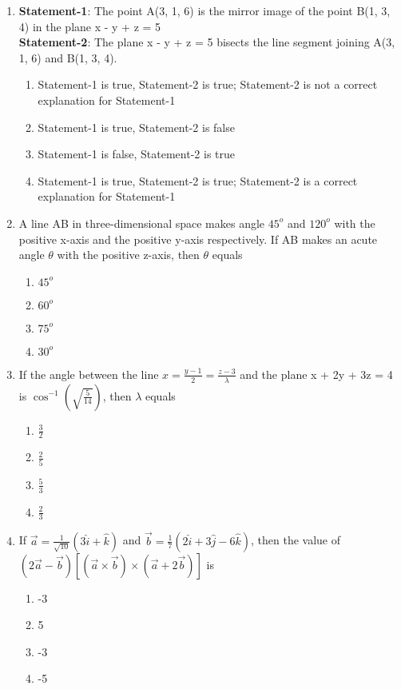 \begin{enumerate}[label=\arabic*.,ref=\thesubsection.\theenumi]
\item \textbf{Statement-1}: The point A(3, 1, 6) is the mirror image of the point B(1, 3, 4) in the plane x - y + z = 5\\
\textbf{Statement-2}: The plane x - y + z = 5 bisects the line segment joining A(3, 1, 6) and B(1, 3, 4).
\begin{enumerate}
\item Statement-1 is true, Statement-2 is true; Statement-2 is not a correct explanation for Statement-1
\item Statement-1 is true, Statement-2 is false
\item Statement-1 is false, Statement-2 is true
\item Statement-1 is true, Statement-2 is true; Statement-2 is a correct explanation for Statement-1
\end{enumerate}

\item A line AB in three-dimensional space makes angle $45^{o}$ and $120^{o}$ with the positive x-axis and the positive y-axis respectively. If AB makes an acute angle $\theta$ with the positive z-axis, then $\theta$ equals
\begin{enumerate}
\item $45^{o}$
\item $60^{o}$
\item $75^{o}$
\item $30^{o}$
\end{enumerate}

\item If the angle between the line $x = \frac{y - 1}{2} = \frac{z - 3}{\lambda}$ and the plane x + 2y + 3z = 4 is 
$\cos^{-1}(\sqrt{\frac{5}{14}})$, then $\lambda$ equals
\begin{enumerate}
\item $\frac{3}{2}$
\item $\frac{2}{5}$
\item $\frac{5}{3}$
\item $\frac{2}{3}$
\end{enumerate}

\item If $\overrightarrow{a} = \frac{1}{\sqrt{10}}(3\hat{i} + \hat{k})$ and $\overrightarrow{b} = \frac{1}{7}(2\hat{i}+3\hat{j} - 6\hat{k})$, then the value of $(2\overrightarrow{a} - \overrightarrow{b})[(\overrightarrow{a} \times \overrightarrow{b}) \times (\overrightarrow{a} + 2\overrightarrow{b})]$ is
\begin{enumerate}
\item -3
\item 5
\item -3
\item -5
\end{enumerate}


\end{enumerate}
